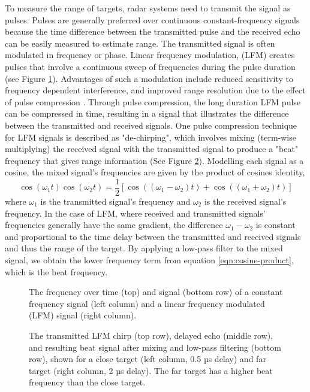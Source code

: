 To measure the range of targets, radar systems need to transmit the signal as pulses. Pulses are
generally preferred over continuous constant-frequency signals because the time difference between
the transmitted pulse and the received echo can be easily measured to estimate range. The 
transmitted signal is often modulated in frequency or phase. Linear frequency modulation,
(LFM) creates pulses that involve a continuous sweep of frequencies during the pulse duration
(see Figure \ref{fig:LFM}). Advantages of such a modulation include reduced sensitivity to
frequency dependent interference, and improved range resolution due to the effect of pulse compression 
\cite{Richards2005FundamentalsRadarSP}.
Through pulse compression, the long duration LFM pulse can be compressed in time, resulting in a 
signal that illustrates the difference between the transmitted and received signals. One pulse
compression technique for LFM signals is described as "de-chirping", which involves mixing
(term-wise multiplying) the received signal with the transmitted signal to produce a "beat"
frequency that gives range information (See Figure \ref{fig:de-chirping}). Modelling each signal
as a cosine, the mixed signal's frequencies are given by the product of cosines identity,
\begin{equation}
    \label{eqn:cosine-product}
    \cos(\omega_1 t)\cos(\omega_2 t) = \frac{1}{2} [\cos((\omega_1-\omega_2)t) + \cos((\omega_1+\omega_2)t)]
\end{equation}
where $\omega_1$ is the transmitted signal's frequency and $\omega_2$ is the received signal's frequency.
In the case of LFM, where received and transmitted signals' frequencies generally have 
the same gradient, the difference $\omega_1-\omega_2$ is constant and proportional to the time delay between 
the transmitted and received signals and thus the range of the target. 
By applying a low-pass filter to the mixed signal, we obtain the lower frequency 
term from equation \ref{eqn:cosine-product}, which is the beat frequency.  

\begin{figure}[htb]
    \caption[Linear Frequency vs Constant Frequency]{The frequency over time (top) 
    and signal (bottom row) of 
    a constant frequency signal (left column) and a linear frequency modulated 
    (LFM) 
    signal (right column).}
    \label{fig:LFM}
\end{figure}

\begin{figure}[htb]
    \label{fig:de-chirping}
    \caption[Transmitted LFM chirp, echo, and beat signal for close and far targets.]{The transmitted LFM chirp 
    (top row), delayed echo (middle row), and resulting beat
    signal after mixing and low-pass filtering (bottom row), shown for a close target 
    (left column, 0.5 µs
    delay) and far target (right column, 2 µs delay). The far target has a higher beat frequency than the
    close target.}
\end{figure}

